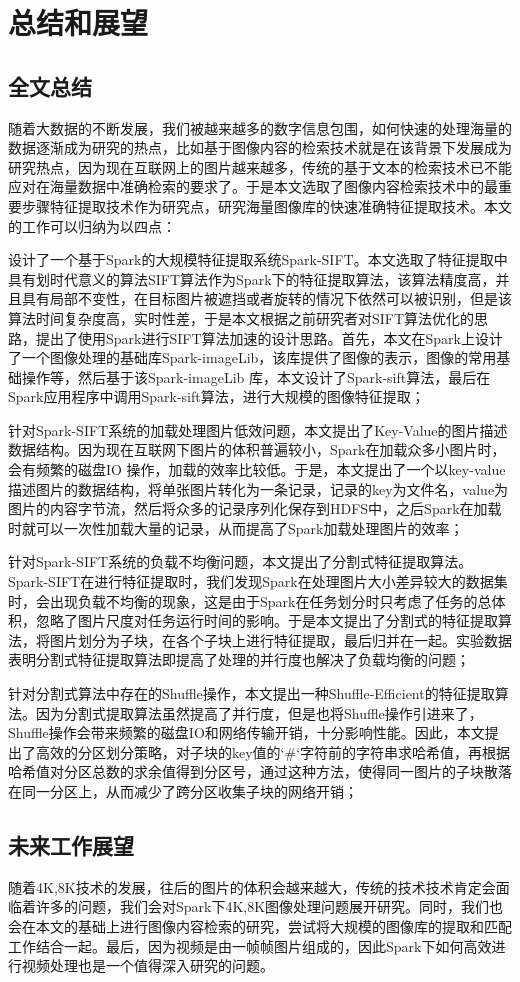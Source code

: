 ﻿\chapter{总结和展望}
\section{全文总结}
随着大数据的不断发展，我们被越来越多的数字信息包围，如何快速的处理海量的数据逐渐成为研究的热点，比如基于图像内容的检索技术就是在该背景下发展成为研究热点，因为现在互联网上的图片越来越多，传统的基于文本的检索技术已不能应对在海量数据中准确检索的要求了。于是本文选取了图像内容检索技术中的最重要步骤特征提取技术作为研究点，研究海量图像库的快速准确特征提取技术。本文的工作可以归纳为以四点：
\begin{compactenum}
\item 设计了一个基于Spark的大规模特征提取系统Spark-SIFT。本文选取了特征提取中具有划时代意义的算法SIFT算法作为Spark下的特征提取算法，该算法精度高，并且具有局部不变性，在目标图片被遮挡或者旋转的情况下依然可以被识别，但是该算法时间复杂度高，实时性差，于是本文根据之前研究者对SIFT算法优化的思路，提出了使用Spark进行SIFT算法加速的设计思路。首先，本文在Spark上设计了一个图像处理的基础库Spark-imageLib，该库提供了图像的表示，图像的常用基础操作等，然后基于该Spark-imageLib 库，本文设计了Spark-sift算法，最后在Spark应用程序中调用Spark-sift算法，进行大规模的图像特征提取；
\item 针对Spark-SIFT系统的加载处理图片低效问题，本文提出了Key-Value的图片描述数据结构。因为现在互联网下图片的体积普遍较小，Spark在加载众多小图片时，会有频繁的磁盘IO 操作，加载的效率比较低。于是，本文提出了一个以key-value描述图片的数据结构，将单张图片转化为一条记录，记录的key为文件名，value为图片的内容字节流，然后将众多的记录序列化保存到HDFS中，之后Spark在加载时就可以一次性加载大量的记录，从而提高了Spark加载处理图片的效率；
\item 针对Spark-SIFT系统的负载不均衡问题，本文提出了分割式特征提取算法。Spark-SIFT在进行特征提取时，我们发现Spark在处理图片大小差异较大的数据集时，会出现负载不均衡的现象，这是由于Spark在任务划分时只考虑了任务的总体积，忽略了图片尺度对任务运行时间的影响。于是本文提出了分割式的特征提取算法，将图片划分为子块，在各个子块上进行特征提取，最后归并在一起。实验数据表明分割式特征提取算法即提高了处理的并行度也解决了负载均衡的问题；
\item 针对分割式算法中存在的Shuffle操作，本文提出一种Shuffle-Efficient的特征提取算法。因为分割式提取算法虽然提高了并行度，但是也将Shuffle操作引进来了，Shuffle操作会带来频繁的磁盘IO和网络传输开销，十分影响性能。因此，本文提出了高效的分区划分策略，对子块的key值的`\#`字符前的字符串求哈希值，再根据哈希值对分区总数的求余值得到分区号，通过这种方法，使得同一图片的子块散落在同一分区上，从而减少了跨分区收集子块的网络开销；
\end{compactenum}
\section{未来工作展望}
随着4K,8K技术的发展，往后的图片的体积会越来越大，传统的技术技术肯定会面临着许多的问题，我们会对Spark下4K,8K图像处理问题展开研究。同时，我们也会在本文的基础上进行图像内容检索的研究，尝试将大规模的图像库的提取和匹配工作结合一起。最后，因为视频是由一帧帧图片组成的，因此Spark下如何高效进行视频处理也是一个值得深入研究的问题。
